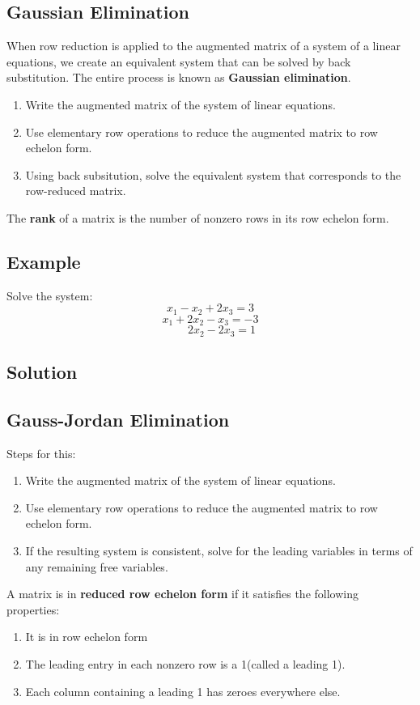 \subsection*{Gaussian Elimination}
When row reduction is applied to the augmented matrix of a system of a linear equations, we create an equivalent system that can be solved by back substitution. The entire process is known as \textbf{Gaussian elimination}.
\begin{enumerate}
    \item Write the augmented matrix of the system of linear equations.
    \item Use elementary row operations to reduce the augmented matrix to row echelon form. 
    \item Using back subsitution, solve the equivalent system that corresponds to the row-reduced matrix.
\end{enumerate}
The \textbf{rank} of a matrix is the number of nonzero rows in its row echelon form.
\subsection*{Example}
Solve the system:
$$x_1 - x_2 + 2x_3 = 3$$
$$x_1 + 2x_2 - x_3 = -3$$
$$\qquad 2x_2 - 2x_3 = 1$$
\subsection*{Solution}

\subsection*{Gauss-Jordan Elimination}
Steps for this: \begin{enumerate}
    \item Write the augmented matrix of the system of linear equations.
    \item Use elementary row operations to reduce the augmented matrix to row echelon form.
    \item If the resulting system is consistent, solve for the leading variables in terms of any remaining free variables.
\end{enumerate}
A matrix is in \textbf{reduced row echelon form}  if it satisfies the following properties:
\begin{enumerate}
    \item It is in row echelon form
    \item The leading entry in each nonzero row is a 1(called a leading 1).
    \item Each column containing a leading 1 has zeroes everywhere else.
\end{enumerate}
